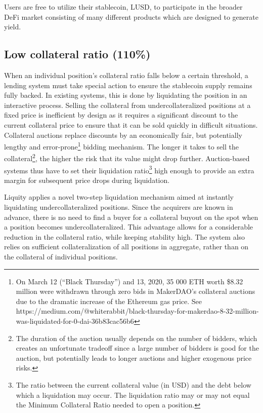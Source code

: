 \documentclass{article}
\begin{document}
Users are free to utilize their stablecoin, LUSD, to participate in the broader DeFi market consisting of many different products which are designed to generate yield.

\subsection{Low collateral ratio (110\%)}
When an individual position’s collateral ratio falls below a certain threshold, a lending system must take special action to ensure the stablecoin supply remains fully backed. In existing systems, this is done by liquidating the position in an interactive process. Selling the collateral from undercollateralized positions at a fixed price is inefficient by design as it requires a significant discount to the current collateral price to ensure that it can be sold quickly in difficult situations. Collateral auctions replace discounts by an economically fair, but potentially lengthy and error-prone\footnote{On March 12 (“Black Thursday”) and 13, 2020, 35 000 ETH worth \$8.32 million were withdrawn through zero bids in MakerDAO’s collateral auctions due to the dramatic increase of the Ethereum gas price. See https://medium.com/@whiterabbit/black-thursday-for-makerdao-8-32-million-was-liquidated-for-0-dai-36b83cac56b6} bidding mechanism. The longer it takes to sell the collateral\footnote{The duration of the auction usually depends on the number of bidders, which creates an unfortunate tradeoff since a large number of bidders is good for the auction, but potentially leads to longer auctions and higher exogenous price risks.}, the higher the risk that its value might drop further. Auction-based systems thus have to set their liquidation ratio\footnote{The ratio between the current collateral value (in USD) and the debt below which a liquidation may occur. The liquidation ratio may or may not equal the Minimum Collateral Ratio needed to open a position.} high enough to provide an extra margin for subsequent price drops during liquidation.

Liquity applies a novel two-step liquidation mechanism aimed at instantly liquidating undercollateralized positions. Since the acquirers are known in advance, there is no need to find a buyer for a collateral buyout on the spot when a position becomes undercollateralized. This advantage allows for a considerable reduction in the collateral ratio, while keeping stability high. The system also relies on sufficient collateralization of all positions in aggregate, rather than on the collateral of individual positions.
\end{document}
